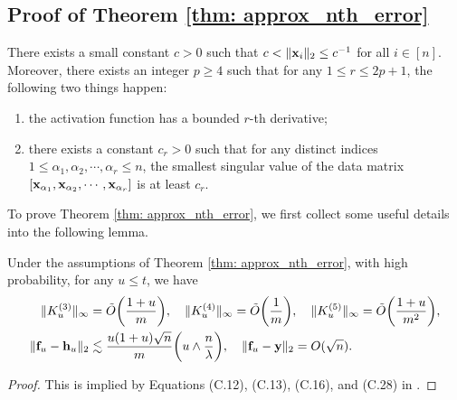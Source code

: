 \subsection{Proof of Theorem \ref{thm: approx_nth_error}} \label{subappend:proof_approx_nth_error}

\begin{assump}
	\label{assump: justify_approx_error}
	There exists a small constant $c>0$ such that $c < \|{\mathbf{x}}_i \|_2\leq c^{-1}$ for all $i\in[n]$. Moreover, there exists an integer $p\geq 4$ such that for any $1\leq r\leq 2p+1$, the following two things happen: 
	\begin{enumerate}[itemsep=0mm]
		\item the activation function has a bounded $r$-th derivative; 
		\item there exists a constant $c_r>0$ such that for any distinct indices $1\leq \alpha_1, \alpha_2, \cdots, \alpha_r\leq n$, the smallest singular value of the data matrix $[{\mathbf{x}}_{\alpha_1}, {\mathbf{x}}_{\alpha_2}, \cdots, {\mathbf{x}}_{\alpha_r}]$ is at least $c_r$.
	\end{enumerate}
\end{assump}

To prove Theorem \ref{thm: approx_nth_error}, we first collect some useful details into the following lemma.
\begin{lemma}
	\label{lemma: nth_estimate}
	Under the assumptions of Theorem \ref{thm: approx_nth_error}, with high probability, for any $u\leq t$, we have
	\begin{align*}
		\| \KKK_u\|_\infty & = \tilde{O}\bigg(\frac{1+u}{m}\bigg), \ \ \ \| \KKKK_u\|_\infty = \tilde{O}\bigg(\frac{1}{m}\bigg), \ \ \ \| K_u^{(5)}\|_\infty = \tilde{O}\bigg(\frac{1+u}{m^2}\bigg), \\
		\| \rvf_u -\rvh_u \|_2 & \lesssim \frac{u(1+u)\sqrt{n}}{{m}} \bigg(u \land \frac{n}{\lambda}\bigg), \ \ \ \|\rvf_u - \rvy \|_2 = O(\sqrt{n}).
	\end{align*}
\end{lemma}
\begin{proof}
	This is implied by Equations (C.12), (C.13), (C.16), and (C.28) in \cite{huang2019dynamics}.
\end{proof}

